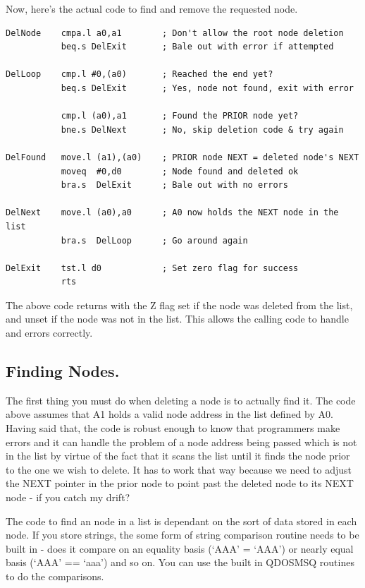 Now, here's the actual code to find and remove the requested
      node.

\begin{lstlisting}[firstnumber=last,caption={Deleting a Node},label={lst:DeletingANode}]
DelNode    cmpa.l a0,a1        ; Don't allow the root node deletion
           beq.s DelExit       ; Bale out with error if attempted

DelLoop    cmp.l #0,(a0)       ; Reached the end yet?
           beq.s DelExit       ; Yes, node not found, exit with error

           cmp.l (a0),a1       ; Found the PRIOR node yet?
           bne.s DelNext       ; No, skip deletion code & try again

DelFound   move.l (a1),(a0)    ; PRIOR node NEXT = deleted node's NEXT 
           moveq  #0,d0        ; Node found and deleted ok
           bra.s  DelExit      ; Bale out with no errors

DelNext    move.l (a0),a0      ; A0 now holds the NEXT node in the list
           bra.s  DelLoop      ; Go around again

DelExit    tst.l d0            ; Set zero flag for success
           rts
\end{lstlisting}

The above code returns with the Z flag set if the node was deleted
      from the list, and unset if the node was not in the list. This allows
      the calling code to handle and errors correctly.

\subsection{Finding Nodes.}
\label{ch10-finding-nodes}%

The first thing you must do when deleting a node is to actually
      find it. The code above assumes that A1 holds a valid node address in
      the list defined by A0. Having said that, the code is robust enough to
      know that programmers make errors and it can handle the problem of a
      node address being passed which is not in the list by virtue of the fact
      that it scans the list until it finds the node prior to the one we wish
      to delete. It has to work that way because we need to adjust the NEXT
      pointer in the prior node to point past the deleted node to its NEXT
      node -{} if you catch my drift?

The code to find an node in a list is dependant on the sort of
      data stored in each node. If you store strings, the some form of string
      comparison routine needs to be built in -{} does it compare on an equality
      basis (`AAA' = `AAA') or nearly equal basis (`AAA' == `aaa') and so on.
      You can use the built in QDOSMSQ routines to do the comparisons.


